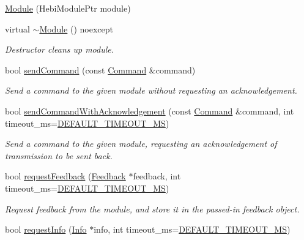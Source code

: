 \begin{DoxyCompactItemize}
\item 
\hyperlink{classhebi_1_1Module_af8192ddf0477c4bc59f0dd2bd009b08e}{Module} (Hebi\+Module\+Ptr module)
\item 
virtual \hyperlink{classhebi_1_1Module_a378cb7c5f76bbaa8fa26a084fb8bda5c}{$\sim$\+Module} () noexcept\hypertarget{classhebi_1_1Module_a378cb7c5f76bbaa8fa26a084fb8bda5c}{}\label{classhebi_1_1Module_a378cb7c5f76bbaa8fa26a084fb8bda5c}

\begin{DoxyCompactList}\small\item\em Destructor cleans up module. \end{DoxyCompactList}\item 
bool \hyperlink{classhebi_1_1Module_a63034ea7310270b62166380aeb10a5cf}{send\+Command} (const \hyperlink{classhebi_1_1Command}{Command} \&command)
\begin{DoxyCompactList}\small\item\em Send a command to the given module without requesting an acknowledgement. \end{DoxyCompactList}\item 
bool \hyperlink{classhebi_1_1Module_a51fb07826384f58697a2e276464d83cb}{send\+Command\+With\+Acknowledgement} (const \hyperlink{classhebi_1_1Command}{Command} \&command, int timeout\+\_\+ms=\hyperlink{classhebi_1_1Module_afba0d28ff83c8ddabd8f6490e412c821}{D\+E\+F\+A\+U\+L\+T\+\_\+\+T\+I\+M\+E\+O\+U\+T\+\_\+\+MS})
\begin{DoxyCompactList}\small\item\em Send a command to the given module, requesting an acknowledgement of transmission to be sent back. \end{DoxyCompactList}\item 
bool \hyperlink{classhebi_1_1Module_a5a7fa02cdcc5baf34f17c0e3badfc1e8}{request\+Feedback} (\hyperlink{classhebi_1_1Feedback}{Feedback} $\ast$feedback, int timeout\+\_\+ms=\hyperlink{classhebi_1_1Module_afba0d28ff83c8ddabd8f6490e412c821}{D\+E\+F\+A\+U\+L\+T\+\_\+\+T\+I\+M\+E\+O\+U\+T\+\_\+\+MS})
\begin{DoxyCompactList}\small\item\em Request feedback from the module, and store it in the passed-\/in feedback object. \end{DoxyCompactList}\item 
bool \hyperlink{classhebi_1_1Module_a90fdca0e2c4d1ebd1cbdd3f1e05adc3c}{request\+Info} (\hyperlink{classhebi_1_1Info}{Info} $\ast$info, int timeout\+\_\+ms=\hyperlink{classhebi_1_1Module_afba0d28ff83c8ddabd8f6490e412c821}{D\+E\+F\+A\+U\+L\+T\+\_\+\+T\+I\+M\+E\+O\+U\+T\+\_\+\+MS})

\end{DoxyCompactItemize}
